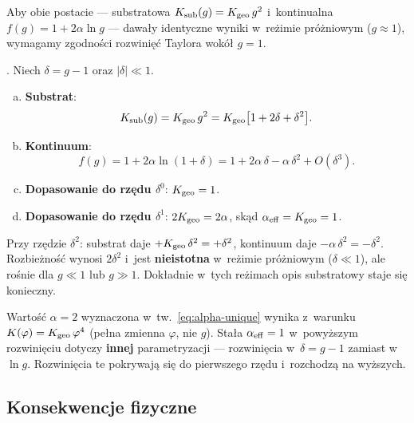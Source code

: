 Aby obie postacie --- substratowa $K_{\rm sub}(g) = K_{\rm geo}\,g^2$
i~kontinualna $f(g) = 1 + 2\alpha\ln g$ --- dawały identyczne
wyniki w~reżimie próżniowym ($g \approx 1$), wymagamy zgodności
rozwinięć Taylora wokół $g = 1$.

\begin{proposition}%
\label{prop:matching}
.
Niech $\delta = g - 1$ oraz $|\delta| \ll 1$.
\begin{enumerate}[(a)]
  \item \textbf{Substrat}:
    \begin{equation}\label{eq:Ksub-taylor}
      K_{\rm sub}(g) = K_{\rm geo}\,g^2
      = K_{\rm geo}\bigl[1 + 2\delta + \delta^2\bigr].
    \end{equation}
  \item \textbf{Kontinuum}:
    \begin{equation}\label{eq:f-taylor}
      f(g) = 1 + 2\alpha\ln(1+\delta)
      = 1 + 2\alpha\,\delta - \alpha\,\delta^2 + O(\delta^3).
    \end{equation}
  \item \textbf{Dopasowanie do rzędu $\delta^0$}: $K_{\rm geo} = 1$.
  \item \textbf{Dopasowanie do rzędu $\delta^1$}:
    $2K_{\rm geo} = 2\alpha$, skąd $\alpha_{\rm eff} = K_{\rm geo} = 1$.
\end{enumerate}
\end{proposition}

\begin{remark}\label{rem:discrepancy}
Przy rzędzie $\delta^2$: substrat daje $+K_{\rm geo}\,\delta^2 = +\delta^2$,
kontinuum daje $-\alpha\,\delta^2 = -\delta^2$.
Rozbieżność wynosi $2\delta^2$ i~jest \textbf{nieistotna}
w~reżimie próżniowym ($\delta \ll 1$), ale rośnie dla $g \ll 1$ lub $g \gg 1$.
Dokładnie w~tych reżimach opis substratowy staje się konieczny.

Wartość $\alpha = 2$ wyznaczona w~tw.~\ref{eq:alpha-unique}
wynika z~warunku $K(\varphi) = K_{\rm geo}\,\varphi^4$
(pełna zmienna $\varphi$, nie $g$).
Stała $\alpha_{\rm eff} = 1$ w~powyższym rozwinięciu
dotyczy \textbf{innej} parametryzacji --- rozwinięcia
w~$\delta = g - 1$ zamiast w~$\ln g$.
Rozwinięcia te pokrywają się do pierwszego rzędu
i~rozchodzą na wyższych.
\end{remark}

\subsection{Konsekwencje fizyczne}\label{ssec:physical-consequences}

